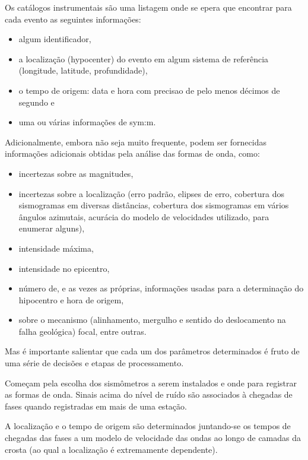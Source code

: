 Os catálogos instrumentais são uma listagem onde se epera que encontrar para cada evento as seguintes informações:

\begin{itemize}\setlength{\itemsep}{0em}
	\item algum identificador,
	\item a localização (\gls{hypocenter}) do evento em algum sistema de referência (longitude, latitude, profundidade),
	\item o tempo de origem: data e hora com precisao de pelo menos décimos de segundo e
	\item uma ou várias informações de \glsdesc{sym:m}.
\end{itemize} 

Adicionalmente, embora não seja muito frequente, podem ser fornecidas informações adicionais obtidas pela análise das formas de
onda, como:

\begin{itemize}\setlength{\itemsep}{0em}
	\item incertezas sobre as magnitudes,
	\item incertezas sobre a localização (erro padrão, elipses de erro, cobertura dos sismogramas em diversas distâncias, cobertura
	dos sismogramas em vários ângulos azimutais, acurácia do modelo de velocidades utilizado, para enumerar alguns),
	\item intensidade máxima,
	\item intensidade no epicentro,
	\item número de, e as vezes as próprias, informações usadas para a determinação do hipocentro e hora de origem,
	\item sobre o mecanismo (alinhamento, mergulho e sentido do deslocamento na falha geológica) focal, entre outras.
\end{itemize} 

Mas é importante salientar \citep{woessner_catalog_2010} que cada um dos parâmetros determinados é fruto de uma série de decisões
e etapas de processamento.

Começam pela escolha dos sismômetros a serem instalados e onde para registrar as formas de onda. Sinais acima do nível de ruído
são associados à chegadas de fases quando registradas em mais de uma estação. 

A localização e o tempo de origem são
determinados juntando-se os tempos de chegadas das fases a um modelo de velocidade das ondas ao longo de camadas da crosta (ao
qual a localização é extremamente dependente). 

